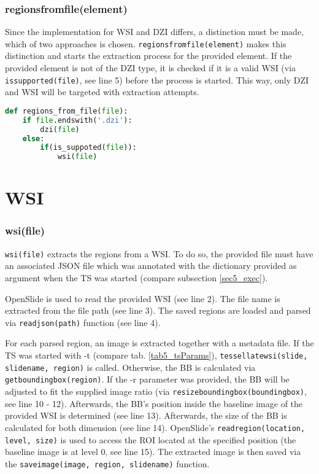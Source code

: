 \subsubsection{regions{\textunderscore}from{\textunderscore}file(element)}
Since the implementation for WSI and DZI differs, a distinction must be made, which of two approaches is chosen. \texttt{regions{\textunderscore}from{\textunderscore}file(element)} makes this distinction and starts the extraction process for the provided element. If the provided element is not of the DZI type, it is checked if it is a valid WSI (via \texttt{is{\textunderscore}supported(file)}, see line 5) before the process is started. This way, only DZI and WSI will be targeted with extraction attempts.
\begin{lstlisting}[frame=single,language=python]
def regions_from_file(file):
	if file.endswith('.dzi'):
		dzi(file)
	else:
		if(is_suppoted(file)):
			wsi(file)
\end{lstlisting}
\clearpage


\section{WSI}

\subsubsection{wsi(file)}
\texttt{wsi(file)} extracts the regions from a WSI. To do so, the provided file must have an associated JSON file which was annotated with the dictionary provided as argument when the TS was started (compare subsection \ref{sec5_exec}).

OpenSlide is used to read the provided WSI (see line 2). The file name is extracted from the file path (see line 3). The saved regions are loaded and parsed via \texttt{read{\textunderscore}json(path)} function (see line 4).

For each parsed region, an image is extracted together with a metadata file. If the TS was started with -t (compare tab. \ref{tab5_tsParams}), \texttt{tessellate{\textunderscore}wsi(slide, slide{\textunderscore}name, region)} is called. Otherwise, the BB is calculated via \texttt{get{\textunderscore}{\allowbreak}bounding{\textunderscore}box(region)}. If the -r parameter was provided, the BB will be adjusted to fit the supplied image ratio (via \texttt{resize{\textunderscore}bounding{\textunderscore}box(bounding{\textunderscore}box)}, see line 10 - 12). Afterwards, the BB's position inside the baseline image of the provided WSI is determined (see line 13). Afterwards, the size of the BB is calculated for both dimension (see line 14). OpenSlide's \texttt{read{\textunderscore}region(location, level, size)} is used to access the ROI located at the specified position (the baseline image is at level 0\cite{DICOM10}, see line 15). The extracted image is then saved via the \texttt{save{\textunderscore}image(image, region, slide{\textunderscore}name)} function.

